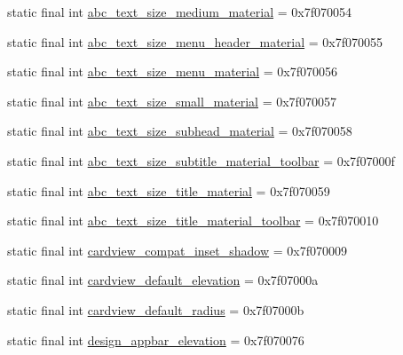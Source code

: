 \begin{CompactItemize}
\item 
static final int \hyperlink{classandroid_1_1support_1_1v7_1_1recyclerview_1_1_r_1_1dimen_ac078165d0ba608a7aaebed27272e7e6}{abc\_\-text\_\-size\_\-medium\_\-material} = 0x7f070054
\item 
static final int \hyperlink{classandroid_1_1support_1_1v7_1_1recyclerview_1_1_r_1_1dimen_ff8073dea53e2f0b667cbf0fe5f6fae9}{abc\_\-text\_\-size\_\-menu\_\-header\_\-material} = 0x7f070055
\item 
static final int \hyperlink{classandroid_1_1support_1_1v7_1_1recyclerview_1_1_r_1_1dimen_cb57c33f071ccb79d4c01baa16ccd37d}{abc\_\-text\_\-size\_\-menu\_\-material} = 0x7f070056
\item 
static final int \hyperlink{classandroid_1_1support_1_1v7_1_1recyclerview_1_1_r_1_1dimen_9a1d01ac92832b2b9103e683ec84f623}{abc\_\-text\_\-size\_\-small\_\-material} = 0x7f070057
\item 
static final int \hyperlink{classandroid_1_1support_1_1v7_1_1recyclerview_1_1_r_1_1dimen_916d63e8fecb1537281719d94f835470}{abc\_\-text\_\-size\_\-subhead\_\-material} = 0x7f070058
\item 
static final int \hyperlink{classandroid_1_1support_1_1v7_1_1recyclerview_1_1_r_1_1dimen_2f5372fb1f8b481a09ae0d1e7c23c035}{abc\_\-text\_\-size\_\-subtitle\_\-material\_\-toolbar} = 0x7f07000f
\item 
static final int \hyperlink{classandroid_1_1support_1_1v7_1_1recyclerview_1_1_r_1_1dimen_51ca44e3c62df79bc40278dd70865232}{abc\_\-text\_\-size\_\-title\_\-material} = 0x7f070059
\item 
static final int \hyperlink{classandroid_1_1support_1_1v7_1_1recyclerview_1_1_r_1_1dimen_d83f5e1141bec91a15d34b55ec7d0da7}{abc\_\-text\_\-size\_\-title\_\-material\_\-toolbar} = 0x7f070010
\item 
static final int \hyperlink{classandroid_1_1support_1_1v7_1_1recyclerview_1_1_r_1_1dimen_e14f31256df8e6ba04fa71f69f0d73fd}{cardview\_\-compat\_\-inset\_\-shadow} = 0x7f070009
\item 
static final int \hyperlink{classandroid_1_1support_1_1v7_1_1recyclerview_1_1_r_1_1dimen_080a509934816e608a1b39732ac17b21}{cardview\_\-default\_\-elevation} = 0x7f07000a
\item 
static final int \hyperlink{classandroid_1_1support_1_1v7_1_1recyclerview_1_1_r_1_1dimen_0dfae5217120d2c0c82f0424f7863a75}{cardview\_\-default\_\-radius} = 0x7f07000b
\item 
static final int \hyperlink{classandroid_1_1support_1_1v7_1_1recyclerview_1_1_r_1_1dimen_11d69956954570bc655c59125aecdb48}{design\_\-appbar\_\-elevation} = 0x7f070076

\end{CompactItemize}
